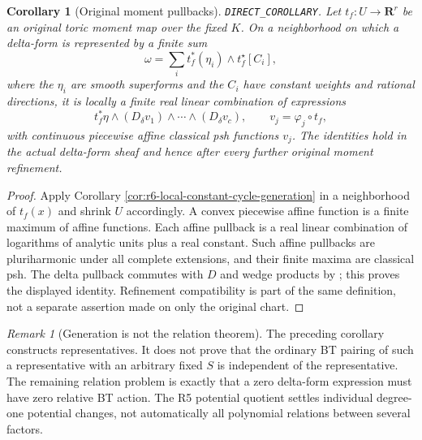 \documentclass[11pt,a4paper]{article}
\numberwithin{equation}{section}
\newtheorem{corollary}[theorem]{Corollary}
\theoremstyle{definition}
\theoremstyle{remark}
\newtheorem{remark}[theorem]{Remark}
\begin{document}
\begin{corollary}[Original moment pullbacks]
\label{cor:r6-moment-cycle-generation}
\textnormal{\texttt{DIRECT\_COROLLARY}.}
Let $t_f:U\to\mathbf R^r$ be an original toric moment map over the
fixed $K$.  On a neighborhood on which a delta-form is represented
by a finite sum
\[
                        \omega=\sum_i t_f^*(\eta_i)\wedge t_f^\star[C_i],
\]
where the $\eta_i$ are smooth superforms and the $C_i$ have constant
weights and rational directions, it is locally a finite real linear
combination of expressions
\[
           t_f^*\eta\wedge(D_\delta v_1)\wedge\cdots\wedge(D_\delta v_c),
 \qquad v_j=\varphi_j\circ t_f,
\]
with continuous piecewise affine classical psh functions $v_j$.
The identities hold in the actual delta-form sheaf and hence after
every further original moment refinement.
\end{corollary}

\begin{proof}
Apply Corollary \ref{cor:r6-local-constant-cycle-generation} in a
neighborhood of $t_f(x)$ and shrink $U$ accordingly.  A convex
piecewise affine function is a finite maximum of affine functions.
Each affine pullback is a real linear combination of logarithms of
analytic units plus a real constant.  Such affine pullbacks are
pluriharmonic under all complete extensions, and their finite maxima
are classical psh.  The delta pullback commutes with $D$ and wedge
products by \cite[Definition 4.2(3)]{Mih24}; this proves the displayed
identity.  Refinement compatibility is part of the same definition,
not a separate assertion made on only the original chart.
\end{proof}

\begin{remark}[Generation is not the relation theorem]
\label{rem:r6-generation-not-relations}
The preceding corollary constructs representatives.  It does not
prove that the ordinary BT pairing of such a representative with
an arbitrary fixed $S$ is independent of the representative.  The
remaining relation problem is exactly that a zero delta-form
expression must have zero relative BT action.  The R5 potential
quotient settles individual degree-one potential changes, not
automatically all polynomial relations between several factors.
\end{remark}
\end{document}
